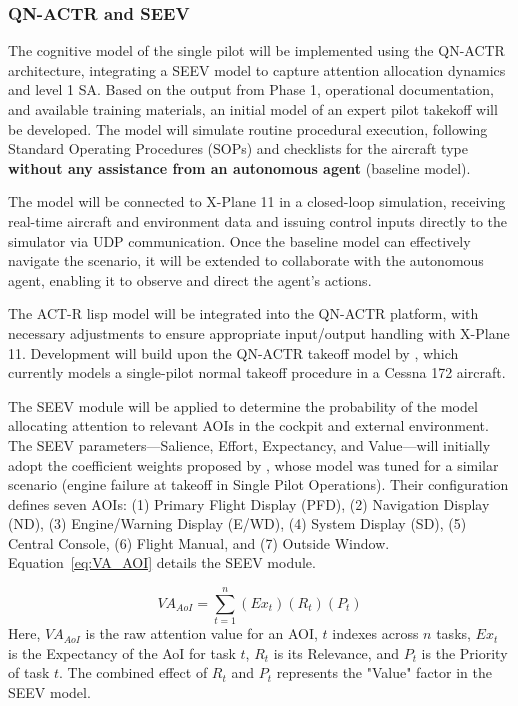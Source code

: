 \documentclass[12pt,a4paper]{article} %
\begin{document}
	\subsubsection{QN-ACTR and SEEV}
	\label{qn-actr-seev}
	The cognitive model of the single pilot will be implemented using the QN-ACTR architecture, integrating a SEEV model to capture attention allocation dynamics and level 1 SA. Based on the output from Phase 1, operational documentation, and available training materials, an initial model of an expert pilot takekoff will be developed. The model will simulate routine procedural execution, following Standard Operating Procedures (SOPs) and checklists for the aircraft type \textbf{without any assistance from an autonomous agent} (baseline model).

	The model will be connected to X-Plane 11 in a closed-loop simulation, receiving real-time aircraft and environment data and issuing control inputs directly to the simulator via UDP communication. Once the baseline model can effectively navigate the scenario, it will be extended to collaborate with the autonomous agent, enabling it to observe and direct the agent's actions.
	
	The ACT-R lisp model will be integrated into the QN-ACTR platform, with necessary adjustments to ensure appropriate input/output handling with X-Plane 11. Development will build upon the QN-ACTR takeoff model by \textcite{xu_modeling_2021}, which currently models a single-pilot normal takeoff procedure in a Cessna 172 aircraft.
	
	The SEEV module will be applied to determine the probability of the model allocating attention to relevant AOIs in the cockpit and external environment. The SEEV parameters—Salience, Effort, Expectancy, and Value—will initially adopt the coefficient weights proposed by \textcite{wang_real-time_2024}, whose model was tuned for a similar scenario (engine failure at takeoff in Single Pilot Operations). Their configuration defines seven AOIs: (1) Primary Flight Display (PFD), (2) Navigation Display (ND), (3) Engine/Warning Display (E/WD), (4) System Display (SD), (5) Central Console, (6) Flight Manual, and (7) Outside Window. Equation~\ref{eq:VA_AOI} details the SEEV module.
	
	\begin{equation}
		VA_{AoI} = \sum_{t=1}^{n} (Ex_t) (R_t) (P_t)
		\label{eq:VA_AOI}
	\end{equation}
	Here, $VA_{AoI}$ is the raw attention value for an AOI, $t$ indexes across $n$ tasks, $Ex_t$ is the Expectancy of the AoI for task $t$, $R_t$ is its Relevance, and $P_t$ is the Priority of task $t$. The combined effect of $R_t$ and $P_t$ represents the "Value" factor in the SEEV model.
	
\end{document}
